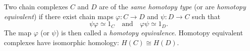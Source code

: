 Two chain complexes $C$ and $D$ are of the \emph{same homotopy type} (or are \emph{homotopy equivalent}) if there exist chain maps $\varphi : C \to D$ and $\psi : D \to C$ such that
$$\psi \varphi \simeq 1_C \quad \text{and} \quad \varphi \psi \simeq 1_D.$$
The map $\varphi$ (or $\psi$) is then called a \emph{homotopy equivalence}. Homotopy equivalent complexes have isomorphic homology: $H(C) \cong H(D)$.